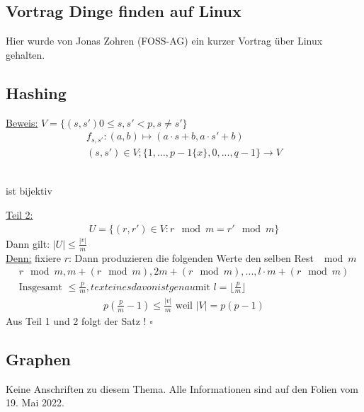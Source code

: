 \subsection{Vortrag \glqq Dinge finden auf Linux\grqq}
Hier wurde von Jonas Zohren (FOSS-AG) ein kurzer Vortrag über Linux gehalten.

\subsection{Hashing}
\underline{Beweis:} $V = \{(s, s') 0 \leq s, s' < p, s \neq s'\}$
\begin{align*}
    f_{s, s'}: (a, b) \mapsto (a \cdot s + b, a \cdot s' + b)\\
   (s, s') \in V; \{ 1, \dots, p-1 \{x\}, 0, ..., q-1\}\rightarrow V
\end{align*}
\begin{center}
\\ ist bijektiv   
\end{center}
\underline{Teil 2:}
\begin{align*}
    U = \{(r, r') \in V: r \mod m = r' \mod m \}
\end{align*}
Dann gilt: $|U| \leq \frac{|v|}{m}$\\
\underline{Denn:} fixiere $r$: Dann produzieren die folgenden Werte den selben Rest $\mod m$\\
\begin{align*}
    r \mod m, m + (r \mod m), 2m + (r \mod m), ..., l \cdot m + (r \mod m)\\
    \text{Insgesamt }\leq \frac{p}{m}, text{eines davon ist genau} \text{mit } l = \lfloor \frac{p}{m}\rfloor
\end{align*}
\begin{align*}
    p(\frac{p}{m} - 1) \leq \frac{|v|}{m} \text{ weil } |V| = p(p -1)
\end{align*}
Aus Teil 1 und 2 folgt der Satz ! \hfill $\square$


\subsection{Graphen}
Keine Anschriften zu diesem Thema. Alle Informationen sind auf den Folien vom 19. Mai 2022.